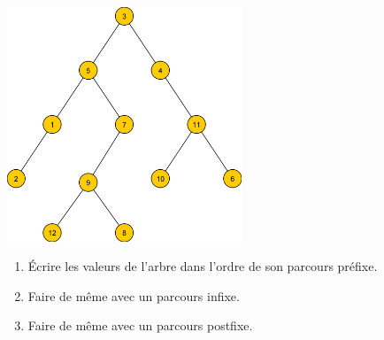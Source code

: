 \documentclass[a4paper,12pt,french]{article}
\begin{document}
\begin{exercice}
    \begin{center}
        \includegraphics[width=7cm]{img/arbre2}
    \end{center}
\begin{enumerate}[\bfseries 1.]
    \item \'Ecrire les valeurs de l'arbre dans l'ordre de son parcours préfixe.
    \item Faire de même avec un parcours infixe.
    \item Faire de même avec un parcours postfixe.
\end{enumerate}
\end{exercice}
\end{document}

